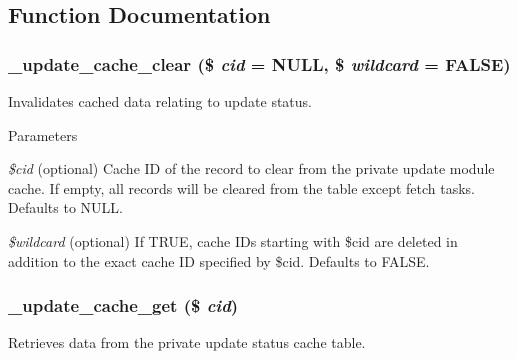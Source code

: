\subsection{Function Documentation}
\hypertarget{group__update__status__cache_ga45fc31b5f9949fc0081ed148a9f378dd}{
\subsubsection[{\_\-update\_\-cache\_\-clear}]{\setlength{\rightskip}{0pt plus 5cm}\_\-update\_\-cache\_\-clear (\$ {\em cid} = {\ttfamily NULL}, \/  \$ {\em wildcard} = {\ttfamily FALSE})}}
\label{group__update__status__cache_ga45fc31b5f9949fc0081ed148a9f378dd}
Invalidates cached data relating to update status.


\begin{DoxyParams}{Parameters}
\item[{\em \$cid}](optional) Cache ID of the record to clear from the private update module cache. If empty, all records will be cleared from the table except fetch tasks. Defaults to NULL. \item[{\em \$wildcard}](optional) If TRUE, cache IDs starting with \$cid are deleted in addition to the exact cache ID specified by \$cid. Defaults to FALSE. \end{DoxyParams}
\hypertarget{group__update__status__cache_ga3f305bb51be069556fa20d692e286f40}{
\subsubsection[{\_\-update\_\-cache\_\-get}]{\setlength{\rightskip}{0pt plus 5cm}\_\-update\_\-cache\_\-get (\$ {\em cid})}}
\label{group__update__status__cache_ga3f305bb51be069556fa20d692e286f40}
Retrieves data from the private update status cache table.


